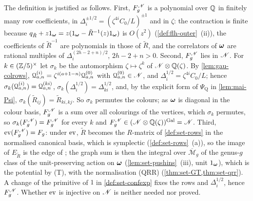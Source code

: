 The definition is justified as follows. First, $F_g^{\mathscr{N}}$ is a polynomial over $\mathbb{Q}$ in finitely many row coefficients, in $\Delta_i^{\pm1/2}=(\zeta^{4i}C_0/L)^{\pm1}$ and in $\zeta$: the contraction is finite because $q_{\tilde R}+z1_{\boldsymbol{\omega}}=z(1_{\boldsymbol{\omega}}-\tilde R^{-1}(z)1_{\boldsymbol{\omega}})$ is $O(z^2)$ (\cref{def:flh-outer}~(ii)), the coefficients of $\tilde R^{-1}$ are polynomials in those of $\tilde R$, and the correlators of $\boldsymbol{\omega}$ are rational multiples of $\Delta_i^{(2h-2+n)/2}$, $2h-2+n>0$. Second, $F_g^{\mathscr{N}}$ lies in $\mathscr{N}$. For $k\in(\mathbb{Z}/5)^\times$ let $\sigma_k$ be the automorphism $\zeta\mapsto\zeta^k$ of $\mathscr{N}\otimes\mathbb{Q}(\zeta)$. By \cref{lem:gau-colrows}, $\mathcal{Q}^{(i)}_{a,n}=\zeta^{i(a+1-n)}\mathcal{Q}^{(0)}_{a,n}$ with $\mathcal{Q}^{(0)}_{a,n}\in\mathscr{N}$, and $\Delta_i^{1/2}=\zeta^{4i}C_0/L$; hence $\sigma_k(\mathcal{Q}^{(i)}_{a,n})=\mathcal{Q}^{(ki)}_{a,n}$, $\sigma_k(\Delta_i^{1/2})=\Delta_{ki}^{1/2}$, and, by the explicit form of $\Psi_{\mathrm Q}$ in \cref{lem:mai-Psi}, $\sigma_k(\tilde R_{ij})=\tilde R_{ki,kj}$. So $\sigma_k$ permutes the colours; as $\boldsymbol{\omega}$ is diagonal in the colour basis, $F_g^{\mathscr{N}}$ is a sum over all colourings of the vertices, which $\sigma_k$ permutes, so $\sigma_k(F_g^{\mathscr{N}})=F_g^{\mathscr{N}}$ for every $k$ and $F_g^{\mathscr{N}}\in(\mathscr{N}\otimes\mathbb{Q}(\zeta))^{\mathrm{Gal}}=\mathscr{N}$. Third, $\operatorname{ev}(F_g^{\mathscr{N}})=F_g$: under $\operatorname{ev}$, $\tilde R$ becomes the $R$-matrix of \cref{def:set-rows} in the normalised canonical basis, which is symplectic (\cref{def:set-rows}~(a)), so the image of $E_{\tilde R}$ is the edge of \cite[Def.~2.2]{PPZ15}; the graph sum is then the integral over $\overline{\mathcal M}_g$ of the genus-$g$ class of the unit-preserving action on $\boldsymbol{\omega}$ (\cref{lem:set-pushins}~(iii), unit $1_{\boldsymbol{\omega}}$), which is the potential by (T), with the normalisation (QRR) (\cref{thm:set-GT,thm:set-qrr}). A change of the primitive of $1$ in \cref{def:set-confexp} fixes the rows and $\Delta_i^{1/2}$, hence $F_g^{\mathscr{N}}$. Whether $\operatorname{ev}$ is injective on $\mathscr{N}$ is neither needed nor proved.


